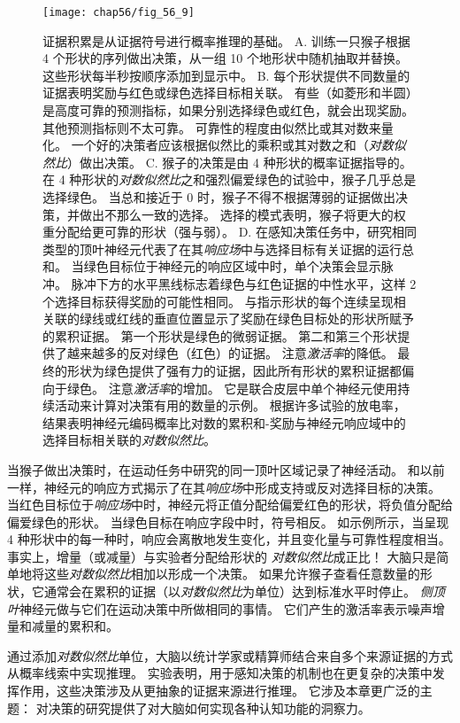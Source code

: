 \begin{figure}[htbp]
	\centering
	\texttt{[image: chap56/fig\_56\_9]}
	\caption{证据积累是从证据符号进行概率推理的基础。
		A. 训练一只猴子根据 4 个形状的序列做出决策，从一组 10 个地形状中随机抽取并替换。
		这些形状每半秒按顺序添加到显示中。
		B. 每个形状提供不同数量的证据表明奖励与红色或绿色选择目标相关联。
		有些（如菱形和半圆）是高度可靠的预测指标，如果分别选择绿色或红色，就会出现奖励。
		其他预测指标则不太可靠。
		可靠性的程度由似然比或其对数来量化。
		一个好的决策者应该根据似然比的乘积或其对数之和（\textit{对数似然比}）做出决策。
		C. 猴子的决策是由 4 种形状的概率证据指导的。
		在 4 种形状的\textit{对数似然比}之和强烈偏爱绿色的试验中，猴子几乎总是选择绿色。
		当总和接近于 0 时，猴子不得不根据薄弱的证据做出决策，并做出不那么一致的选择。
		选择的模式表明，猴子将更大的权重分配给更可靠的形状（强与弱）。
		D. 在感知决策任务中，研究相同类型的顶叶神经元代表了在其\textit{响应场}中与选择目标有关证据的运行总和。
		当绿色目标位于神经元的响应区域中时，单个决策会显示脉冲。
		脉冲下方的水平黑线标志着绿色与红色证据的中性水平，这样 2 个选择目标获得奖励的可能性相同。
		与指示形状的每个连续呈现相关联的绿线或红线的垂直位置显示了奖励在绿色目标处的形状所赋予的累积证据。
		第一个形状是绿色的微弱证据。
		第二和第三个形状提供了越来越多的反对绿色（红色）的证据。
		注意\textit{激活率}的降低。
		最终的形状为绿色提供了强有力的证据，因此所有形状的累积证据都偏向于绿色。
		注意\textit{激活率}的增加。
		它是联合皮层中单个神经元使用持续活动来计算对决策有用的数量的示例。
		根据许多试验的放电率，结果表明神经元编码概率比对数的累积和-奖励与神经元响应域中的选择目标相关联的\textit{对数似然比}\cite{yang2007probabilistic}。}
	\label{fig:56_9}
\end{figure}


当猴子做出决策时，在运动任务中研究的同一顶叶区域记录了神经活动。
和以前一样，神经元的响应方式揭示了在其\textit{响应场}中形成支持或反对选择目标的决策。
当红色目标位于\textit{响应场}中时，神经元将正值分配给偏爱红色的形状，将负值分配给偏爱绿色的形状。
当绿色目标在响应字段中时，符号相反。
如示例所示，当呈现 4 种形状中的每一种时，响应会离散地发生变化，并且变化量与可靠性程度相当。
事实上，增量（或减量）与实验者分配给形状的 \textit{对数似然比}成正比！
大脑只是简单地将这些\textit{对数似然比}相加以形成一个决策。
如果允许猴子查看任意数量的形状，它通常会在累积的证据（以\textit{对数似然比}为单位）达到标准水平时停止。
\textit{侧顶叶}神经元做与它们在运动决策中所做相同的事情。
它们产生的激活率表示噪声增量和减量的累积和。


通过添加\textit{对数似然比}单位，大脑以统计学家或精算师结合来自多个来源证据的方式从概率线索中实现推理。
实验表明，用于感知决策的机制也在更复杂的决策中发挥作用，这些决策涉及从更抽象的证据来源进行推理。
它涉及本章更广泛的主题：
对决策的研究提供了对大脑如何实现各种认知功能的洞察力。



